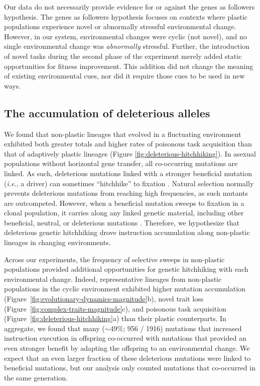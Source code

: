 Our data do not necessarily provide evidence for or against the genes as followers hypothesis.
The genes as followers hypothesis focuses on contexts where plastic populations experience novel or abnormally stressful environmental change.
However, in our system, environmental changes were cyclic (not novel), and no single environmental change was \textit{abnormally} stressful.
Further, the introduction of novel tasks during the second phase of the experiment merely added static opportunities for fitness improvement.
This addition did not change the meaning of existing environmental cues, nor did it require those cues to be used in new ways. 
 

\subsection{The accumulation of deleterious alleles}

We found that non-plastic lineages that evolved in a fluctuating environment exhibited both greater totals and higher rates of poisonous task acquisition than that of adaptively plastic lineages (Figure \ref{fig:deleterious-hitchhiking}).
In asexual populations without horizontal gene transfer, all co-occurring mutations are linked.
As such, deleterious mutations linked with a stronger beneficial mutation (\textit{i.e.}, a driver) can sometimes ``hitchhike'' to fixation \citep{smith_hitch-hiking_1974,van_den_bergh_experimental_2018,buskirk_hitchhiking_2017}.
Natural selection normally prevents deleterious mutations from reaching high frequencies, as such mutants are outcompeted.
However, when a beneficial mutation sweeps to fixation in a clonal population, it carries along any linked genetic material, including other beneficial, neutral, or deleterious mutations \citep{barton_genetic_2000, smith_hitch-hiking_1974}.
Therefore, we hypothesize that deleterious genetic hitchhiking drove  instruction accumulation along non-plastic lineages in changing environments.

Across our experiments, the frequency of selective sweeps in non-plastic populations provided additional opportunities for genetic hitchhiking with each environmental change. 
Indeed, representative lineages from non-plastic populations in the cyclic environment exhibited higher mutation accumulation (Figure~\ref{fig:evolutionary-dynamics-magnitude}b), novel trait loss (Figure~\ref{fig:complex-traits-magnitude}c), and poisonous task acquisition (Figure~\ref{fig:deleterious-hitchhiking}a) than their plastic counterparts.
In aggregate, we found that many ($\sim$49\%; 956 / 1916) mutations that increased  instruction execution in offspring co-occurred with mutations that provided an even stronger benefit by adapting the offspring to an environmental change.
We expect that an even larger fraction of these deleterious mutations were linked to beneficial mutations, but our analysis only counted mutations that co-occurred in the same generation.


